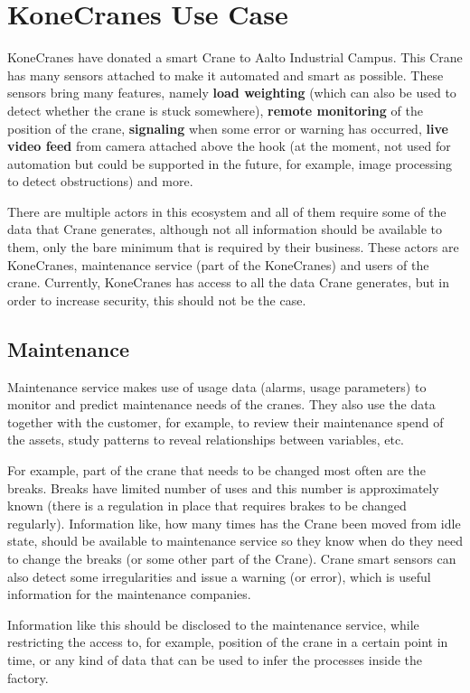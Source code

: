 \chapter{KoneCranes Use Case}
\label{chapter:first-appendix}

KoneCranes have donated a smart Crane to Aalto Industrial Campus. This Crane has 
many sensors attached to make it automated and smart as possible. These sensors
bring many features, namely {\bf load weighting} (which can also be used to detect
whether the crane is stuck somewhere), {\bf remote monitoring } of the position of the crane,
{\bf signaling} when some error or warning has occurred, {\bf live video feed } from camera attached
above the hook (at the moment, not used for automation but could be supported in the future,
for example, image processing to detect obstructions) and more.

There are multiple actors in this ecosystem and all of them require some of the data
that Crane generates, although not all information should be available to them, only
the bare minimum that is required by their business. These actors are KoneCranes, 
maintenance service (part of the KoneCranes) and users of the crane. Currently, KoneCranes has access to all the data Crane generates, but in order to 
increase security, this should not be the case.

\section*{Maintenance}

Maintenance service makes use of usage data (alarms, usage parameters) to monitor and predict maintenance needs of the cranes. They also use the data together with the customer, for example, to review their maintenance spend of the assets, study patterns to reveal relationships between variables, etc.

For example, part of the crane that needs to be changed most often are the breaks.
Breaks have limited number of uses and this number is approximately known
(there is a regulation in place that requires brakes to be changed regularly).
Information like, how many times has the Crane been moved from idle state,
should be available to maintenance service so they know when do they need to
change the breaks (or some other part of the Crane). Crane smart sensors can also 
detect some irregularities and issue a warning (or error),
which is useful information for the maintenance companies.

Information like this should be disclosed to the maintenance service, while
restricting the access to, for example, position of the crane in a certain
point in time, or any kind of data that can be used to infer the processes
inside the factory.

